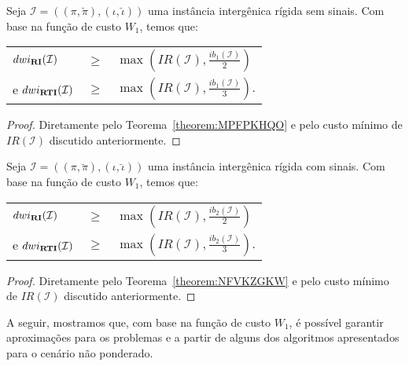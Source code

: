 \begin{theorem}\label{theorem:IQACALLP}
Seja $\mathcal{I} = ((\pi,\breve\pi),(\iota,\breve\iota))$ uma instância intergênica rígida sem sinais. Com base na função de custo $W_1$, temos que:

\begin{tabular}{lll}
  $dwi_{\textbf{RI}}(\mathcal{I})$      & $ \ge $ & $\max(IR(\mathcal{I}),\frac{ib_1(\mathcal{I})}{2})$ \\ 
  e $dwi_{\textbf{RTI}}(\mathcal{I})$     & $ \ge $ & $\max(IR(\mathcal{I}),\frac{ib_1(\mathcal{I})}{3})$.
\end{tabular}
\begin{proof}
Diretamente pelo Teorema~\ref{theorem:MPFPKHQO} e pelo custo mínimo de $IR(\mathcal{I})$ discutido anteriormente.
\end{proof}
\end{theorem}

\begin{theorem}\label{theorem:BOZETXBS}
Seja $\mathcal{I} = ((\pi,\breve\pi),(\iota,\breve\iota))$  uma instância intergênica rígida com sinais. Com base na função de custo $W_1$, temos que:

\begin{tabular}{lll}
  $dwi_{\textbf{RI}}(\mathcal{I})$      & $ \ge $ & $\max(IR(\mathcal{I}),\frac{ib_2(\mathcal{I})}{2})$ \\ 
  e $dwi_{\textbf{RTI}}(\mathcal{I})$     & $ \ge $ & $\max(IR(\mathcal{I}),\frac{ib_2(\mathcal{I})}{3})$.
\end{tabular}
\begin{proof}
Diretamente pelo Teorema~\ref{theorem:NFVKZGKW} e pelo custo mínimo de $IR(\mathcal{I})$ discutido anteriormente.
\end{proof}
\end{theorem}

A seguir, mostramos que, com base na função de custo $W_1$, é possível garantir aproximações para os problemas \SbWIRI{} e \SbWIRTI{} a partir de alguns dos algoritmos apresentados para o cenário não ponderado.

